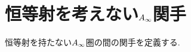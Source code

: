 \documentclass[uplatex, a4paper, 14Q, dvipdfmx]{jsarticle}
\begin{document}

\section{恒等射を考えない\texorpdfstring{$A_{\infty}$}{Ainf}関手} \label{section_non_unital_Ainf_functor}

恒等射を持たない$A_{\infty}$圏の間の関手を定義する. 
\end{document}

